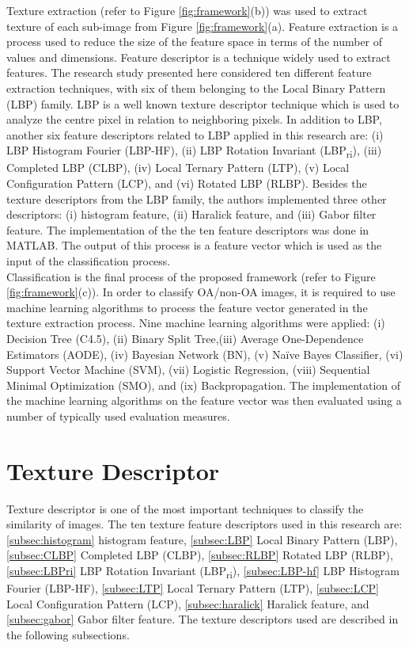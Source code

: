 \documentclass[review]{elsarticle}
\begin{document}
Texture extraction (refer to Figure \ref{fig:framework}(b)) was used to extract texture of each sub-image from Figure \ref{fig:framework}(a). Feature extraction is a process used to reduce the size of the feature space in terms of the number of values and dimensions. Feature descriptor is a technique widely used to extract features. The research study presented here considered ten different feature extraction techniques, with six of them belonging to the Local Binary Pattern (LBP) family. LBP is a well known texture descriptor technique which is used to analyze the centre pixel in relation to neighboring pixels. In addition to LBP, another six feature descriptors related to LBP applied in this research are: (i) LBP Histogram Fourier (LBP-HF), (ii) LBP Rotation Invariant (LBP\textsubscript{ri}), (iii) Completed LBP (CLBP), (iv) Local Ternary Pattern (LTP), (v) Local Configuration Pattern (LCP), and (vi) Rotated LBP (RLBP). Besides the texture descriptors from the LBP family, the authors implemented three other descriptors: (i) histogram feature, (ii) Haralick feature, and (iii) Gabor filter feature. The implementation of the the ten feature descriptors was done in MATLAB. The output of this process is a feature vector which is used as the input of the classification process. \\

Classification is the final process of the proposed framework (refer to Figure \ref{fig:framework}(c)). In order to classify OA/non-OA images, it is required to use machine learning algorithms to process the feature vector generated in the texture extraction process. Nine machine learning algorithms were applied: (i) Decision Tree (C4.5), (ii) Binary Split Tree,(iii) Average One-Dependence Estimators (AODE), (iv) Bayesian Network (BN), (v) Na\"ive Bayes Classifier, (vi) Support Vector Machine (SVM), (vii) Logistic Regression, (viii) Sequential Minimal Optimization (SMO), and (ix) Backpropagation. The implementation of the machine learning algorithms on the feature vector was then evaluated using a number of typically used evaluation measures.

\section{Texture Descriptor}

Texture descriptor is one of the most important techniques to classify the similarity of images. The ten texture feature descriptors used in this research are: \ref{subsec:histogram} histogram feature, \ref{subsec:LBP} Local Binary Pattern (LBP), \ref{subsec:CLBP} Completed LBP (CLBP), \ref{subsec:RLBP} Rotated LBP (RLBP), \ref{subsec:LBPri} LBP Rotation Invariant (LBP\textsubscript{ri}), \ref{subsec:LBP-hf} LBP Histogram Fourier (LBP-HF), \ref{subsec:LTP} Local Ternary Pattern (LTP), \ref{subsec:LCP} Local Configuration Pattern (LCP), \ref{subsec:haralick} Haralick feature, and \ref{subsec:gabor} Gabor filter feature. The texture descriptors used are described in the following subsections.
\end{document}
